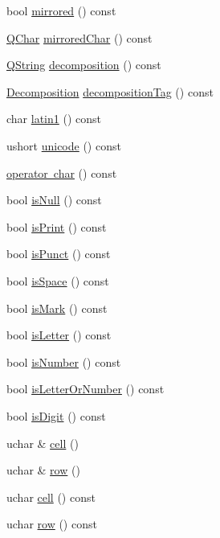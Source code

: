 \begin{DoxyCompactItemize}
\item 
bool \mbox{\hyperlink{class_q_char_ace551e353be06621f91e605f33aa49e6}{mirrored}} () const
\item 
\mbox{\hyperlink{class_q_char}{Q\+Char}} \mbox{\hyperlink{class_q_char_a163b279dcd9ef33c54f1f8bb0e541609}{mirrored\+Char}} () const
\item 
\mbox{\hyperlink{class_q_string}{Q\+String}} \mbox{\hyperlink{class_q_char_a8b40234fbb8bcb58ba2086a610883b7b}{decomposition}} () const
\item 
\mbox{\hyperlink{class_q_char_a13be45046e82a6d2991cef0b7c18d522}{Decomposition}} \mbox{\hyperlink{class_q_char_a1693892912196124bbdbe9b1b14da080}{decomposition\+Tag}} () const
\item 
char \mbox{\hyperlink{class_q_char_a1f86dd8a75eb74565a46caf76a41df8f}{latin1}} () const
\item 
ushort \mbox{\hyperlink{class_q_char_a0fd3d9a4b10d8f6482c5ebd8053b69a8}{unicode}} () const
\item 
\mbox{\hyperlink{class_q_char_a12f9d4ead9f902d34de220b02e5e513d}{operator char}} () const
\item 
bool \mbox{\hyperlink{class_q_char_a580c84db3f1208df21a8427a01fc725c}{is\+Null}} () const
\item 
bool \mbox{\hyperlink{class_q_char_a569287b3f87942299de440ec40549d94}{is\+Print}} () const
\item 
bool \mbox{\hyperlink{class_q_char_a1242013d955d60b26acbba3ed63d556f}{is\+Punct}} () const
\item 
bool \mbox{\hyperlink{class_q_char_a67814eae107b451db9def198ae57aa8a}{is\+Space}} () const
\item 
bool \mbox{\hyperlink{class_q_char_a5b932436088d0aebdeb8d5ec0d13fe54}{is\+Mark}} () const
\item 
bool \mbox{\hyperlink{class_q_char_aa2d2b13b4b6a3c4343c00d28c58b5529}{is\+Letter}} () const
\item 
bool \mbox{\hyperlink{class_q_char_a95ea2bc6938379f1e108b44d61133d29}{is\+Number}} () const
\item 
bool \mbox{\hyperlink{class_q_char_a4307e02d8de59b2a5c4e7a2fc62aa028}{is\+Letter\+Or\+Number}} () const
\item 
bool \mbox{\hyperlink{class_q_char_a5758b5318fe28041c0729dded5b1b44e}{is\+Digit}} () const
\item 
uchar \& \mbox{\hyperlink{class_q_char_a2475b4653bed4cf2a3f10395a14cc9c5}{cell}} ()
\item 
uchar \& \mbox{\hyperlink{class_q_char_a8f987c65692f95eebc84bf687ea92aff}{row}} ()
\item 
uchar \mbox{\hyperlink{class_q_char_a44b4ebc60a4263918bf8f0dfcea49fa6}{cell}} () const
\item 
uchar \mbox{\hyperlink{class_q_char_a34a593cf210ef1ab09e09be78bf8ef3e}{row}} () const
\end{DoxyCompactItemize}

